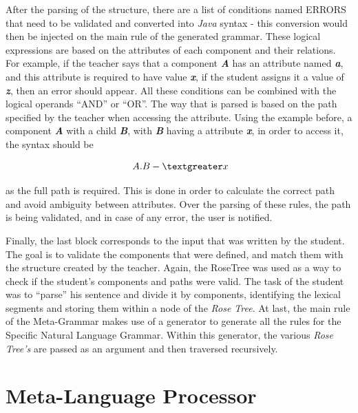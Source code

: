 After the parsing of the structure, there are a list of conditions named ERRORS that need to be validated and converted into \emph{Java} syntax - this conversion would then be injected on the main rule of the generated grammar. These logical expressions are based on the attributes of each component and their relations. For example, if the teacher says that a component \emph{\textbf{A}} has an attribute named \emph{\textbf{a}}, and this attribute is required to have value \emph{\textbf{x}}, if the student assigns it a value of \emph{\textbf{z}}, then an error should appear. All these conditions can be combined with the logical operands ``AND'' or ``OR''. The way that is parsed is based on the path specified by the teacher when accessing the attribute. Using the example before, a component \emph{\textbf{A}} with a child \emph{\textbf{B}}, with \emph{\textbf{B}} having a attribute \emph{\textbf{x}}, in order to access it, the syntax should be

\[ A.B -\textgreater x \]

\noindent as the full path is required. This is done in order to calculate the correct path and avoid ambiguity between attributes. Over the parsing of these rules, the path is being validated, and in case of any error, the user is notified.

Finally, the last block corresponds to the input that was written by the student. 
The goal is to validate the components that were defined, and match them with the structure created by the teacher. 
Again, the RoseTree was used as a way to check if the student’s components and paths were valid. 
The task of the student was to ``parse'' his sentence and divide it by components, identifying the lexical segments and storing them within a node of the \emph{Rose Tree}. 
At last, the main rule of the Meta-Grammar makes use of a generator to generate all the rules for the Specific Natural Language Grammar. 
Within this generator, the various \emph{Rose Tree's} are passed as an argument and then traversed recursively.


\section{Meta-Language Processor}

